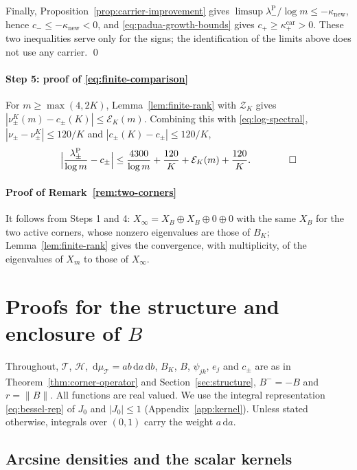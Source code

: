 \documentclass[preprint,12pt,a4paper]{elsarticle}
\theoremstyle{remark}
\newcommand{\Pa}{\mathrm P}
\newcommand{\dd}{\,\mathrm d}
\begin{document}
Finally, Proposition~\ref{prop:carrier-improvement} gives
$\limsup\lambda^\Pa_-/\log m\le-\kappa_{\mathrm{new}}$, hence
$c_-\le-\kappa_{\mathrm{new}}<0$, and \eqref{eq:padua-growth-bounds} gives
$c_+\ge\kappa^{\mathrm{car}}_+>0$. These two inequalities serve only for the
signs; the identification of the limits above does not use any carrier. \qed

\paragraph{Step 5: proof of \eqref{eq:finite-comparison}}
For $m\ge\max(4,2K)$, Lemma~\ref{lem:finite-rank} with $\mathcal Z_K$ gives
$|\nu^K_\pm(m)-c_\pm(K)|\le \mathcal E_K(m)$. Combining this with
\eqref{eq:log-spectral}, $|\nu_\pm-\nu^K_\pm|\le120/K$ and
$|c_\pm(K)-c_\pm|\le120/K$,
\[
 \Bigl|\frac{\lambda^\Pa_\pm}{\log m}-c_\pm\Bigr|
 \le\frac{4300}{\log m}+\frac{120}K+\mathcal E_K(m)+\frac{120}K.\qquad\qed
\]

\paragraph{Proof of Remark~\ref{rem:two-corners}}
It follows from Steps 1 and 4: $X_\infty=X_B\oplus X_B\oplus0\oplus0$ with the
same $X_B$ for the two active corners, whose nonzero eigenvalues are those of
$B_K$; Lemma~\ref{lem:finite-rank} gives the convergence, with multiplicity, of
the eigenvalues of $X_m$ to those of $X_\infty$.

\section{Proofs for the structure and enclosure of \texorpdfstring{$B$}{B}}\label{app:structure}

Throughout, $\mathcal T$, $\mathcal H$, $\dd\mu_{\mathcal T}=ab\dd a\dd b$, $B_K$, $B$, $\psi_{jk}$, $e_j$ and
$c_\pm$ are as in Theorem~\ref{thm:corner-operator} and Section~\ref{sec:structure},
$B^-=-B$ and $r=\|B\|$. All functions are real valued. We use the integral
representation \eqref{eq:bessel-rep} of $J_0$ and $|J_0|\le1$
(Appendix~\ref{app:kernel}). Unless stated otherwise, integrals over $(0,1)$
carry the weight $a\dd a$.

\subsection{Arcsine densities and the scalar kernels}\label{app:arcsine}
\end{document}
